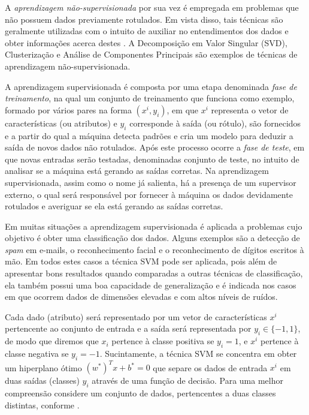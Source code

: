 \documentclass[12pt,a4paper]{scrartcl}
\theoremstyle{definition}%
\begin{document}
A \emph{aprendizagem não-supervisionada} por sua vez é empregada em problemas que não possuem dados previamente rotulados. Em vista disso, tais técnicas são geralmente utilizadas com o intuito de auxiliar no entendimentos dos dados e obter informações acerca destes \cite{Lorena&Carvalho}. A Decomposição em Valor Singular (SVD), Clusterização e Análise de Componentes Principais \cite{Evelin2017} são exemplos de técnicas de aprendizagem não-supervisionada. 

A aprendizagem supervisionada é composta por uma etapa denominada \emph{fase de treinamento}, na qual um conjunto de treinamento que funciona como exemplo, formado por vários pares na forma $(x^{i}, y_{i})$, em que $x^{i}$ representa o vetor de características (ou atributos) e $y_{i}$ corresponde à saída (ou rótulo), são fornecidos e a partir do qual a máquina detecta padrões e cria um modelo para deduzir a saída de novos dados não rotulados. Após este processo ocorre a \emph{fase de teste}, em que novas entradas serão testadas, denominadas conjunto de teste, no intuito de analisar se a máquina está gerando as saídas corretas. Na aprendizagem supervisionada, assim como o nome já salienta, há a presença de um supervisor externo, o qual será responsável por fornecer à máquina os dados devidamente rotulados e averiguar se ela está gerando as saídas corretas.

Em muitas situações a aprendizagem supervisionada é aplicada a problemas cujo objetivo é obter uma classificação dos dados. Alguns exemplos são a detecção de \emph{spam} em e-mails, o reconhecimento facial e o reconhecimento de dígitos escritos à mão. Em todos estes casos a técnica SVM pode ser aplicada, pois além de apresentar bons resultados quando comparadas a outras técnicas de classificação, ela também  possui uma boa capacidade de generalização e é indicada nos casos em que ocorrem dados de dimensões elevadas e com altos níveis de ruídos. 

Cada dado (atributo) será representado por um vetor de características $x^{i}$ pertencente ao conjunto de entrada e a saída será representada por $y_{i} \in \{ -1,1 \}$, de modo que diremos que $x_{i}$ pertence à classe positiva se $y_{i} = 1$, e $x^{i}$ pertence à classe negativa se $y_{i} = -1$. Sucintamente, a técnica SVM se concentra em obter um hiperplano ótimo $(w^{*})^{T}x + b^{*} = 0$ que separe os dados de entrada $x^{i}$ em duas saídas (classes) $y_{i}$ através de uma função de decisão. Para uma melhor compreensão considere um conjunto de dados, pertencentes a duas classes distintas, conforme .
\end{document}
